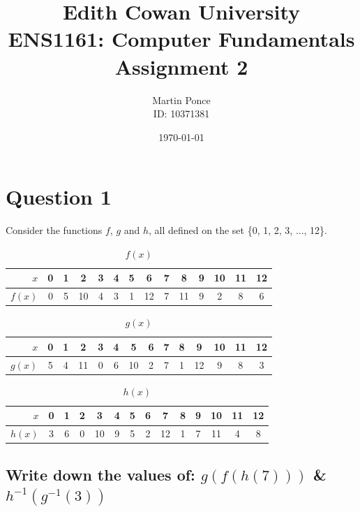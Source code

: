 \documentclass[12pt,a4paper]{article}
\title{Edith Cowan University\\ENS1161: Computer Fundamentals\\Assignment 2}
\author{Martin Ponce\\ID: 10371381}
\date{\today}
\begin{document}


\newpage
\null  %
\nointerlineskip  %
\vfill
\let\snewpage \newpage
\let\newpage \relax
\maketitle
\thispagestyle{empty}
\let \newpage \snewpage
\vfill

\newpage
\tableofcontents

\newpage
\section{Question 1}

Consider the functions $f$, $g$ and $h$, all defined on the set \{0, 1, 2, 3, ..., 12\}.

\begin{table}[!h]
\centering
\caption{$f(x)$}
\begin{tabular}{r|c|c|c|c|c|c|c|c|c|c|c|c|c}
$x$ & 0 & 1 & 2 & 3 & 4 & 5 & 6 & 7 & 8 & 9 & 10 & 11 & 12 \\
\hline
$f(x)$ & 0 & 5 & 10 & 4 & 3 & 1 & 12 & 7 & 11 & 9 & 2 & 8 & 6
\end{tabular}
\end{table}

\begin{table}[!h]
\centering
\caption{$g(x)$}
\begin{tabular}{r|c|c|c|c|c|c|c|c|c|c|c|c|c}
$x$ & 0 & 1 & 2 & 3 & 4 & 5 & 6 & 7 & 8 & 9 & 10 & 11 & 12 \\
\hline
$g(x)$ & 5 & 4 & 11 & 0 & 6 & 10 & 2 & 7 & 1 & 12 & 9 & 8 & 3
\end{tabular}
\end{table}

\begin{table}[!h]
\centering
\caption{$h(x)$}
\begin{tabular}{r|c|c|c|c|c|c|c|c|c|c|c|c|c}
$x$ & 0 & 1 & 2 & 3 & 4 & 5 & 6 & 7 & 8 & 9 & 10 & 11 & 12 \\
\hline
$h(x)$ & 3 & 6 & 0 & 10 & 9 & 5 & 2 & 12 & 1 & 7 & 11 & 4 & 8
\end{tabular}
\end{table}

\subsection{Write down the values of: $g(f(h(7)))$ \& $h^{-1}(g^{-1}(3))$}
\end{document}
